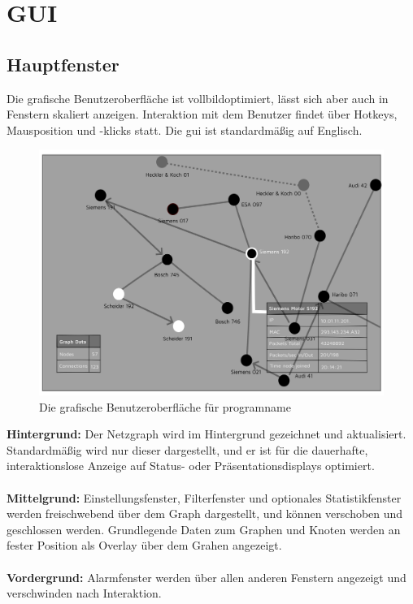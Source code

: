 \chapter{GUI}

\section{Hauptfenster}
Die grafische Benutzeroberfläche ist vollbildoptimiert, lässt sich aber auch in
Fenstern skaliert anzeigen. Interaktion mit dem Benutzer findet über Hotkeys,
Mausposition und -klicks statt.
Die \gls{gui} ist standardmäßig auf Englisch.

  \begin{figure}[h!]
    \hspace*{0.15cm}\includegraphics[scale=0.07]{./img/GUI.png}
    \caption[Die grafische Benutzeroberfläche für \gls{programname}]{Die grafische Benutzeroberfläche für \gls{programname}}
  \end{figure}

\noindent \textbf{Hintergrund:} Der Netzgraph wird im Hintergrund gezeichnet und
aktualisiert. Standardmäßig wird nur dieser dargestellt, und er ist für die
dauerhafte, interaktionslose Anzeige auf Status- oder Präsentationsdisplays
optimiert.
\\ \\
\textbf{Mittelgrund:} Einstellungsfenster, Filterfenster und optionales Statistikfenster
werden freischwebend über dem Graph dargestellt, und können verschoben und
geschlossen werden. Grundlegende Daten zum Graphen und Knoten werden an fester
Position als Overlay über dem Grahen angezeigt.
\\ \\
\textbf{Vordergrund:} Alarmfenster werden über allen anderen Fenstern angezeigt und
verschwinden nach Interaktion.

